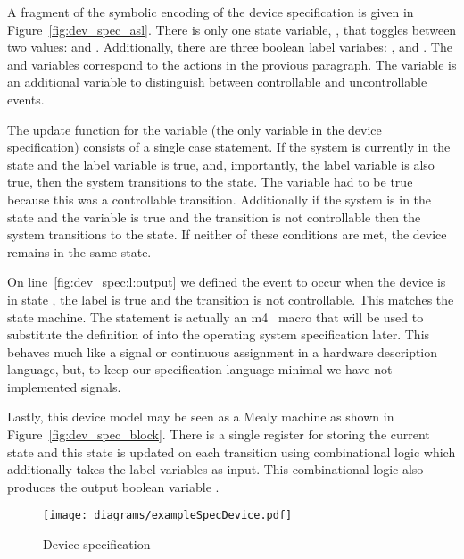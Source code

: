 A fragment of the symbolic encoding of the device specification is given in Figure~\ref{fig:dev_spec_asl}. There is only one state variable, , that toggles between two values:  and . Additionally, there are three boolean label variabes: ,  and . The  and  variables correspond to the actions in the provious paragraph. The  variable is an additional variable to distinguish between controllable and uncontrollable events. 

The update function for the  variable (the only variable in the device specification) consists of a single case statement. If the system is currently in the  state and the  label variable is true, and, importantly, the  label variable is also true, then the system transitions to the  state. The  variable had to be true because this was a controllable transition. Additionally if the system is in the  state and the  variable is true and the transition is not controllable then the system transitions to the  state. If neither of these conditions are met, the device remains in the same state. 

On line~\ref{fig:dev_spec:l:output} we defined the  event to occur when the device is in state , the  label is true and the transition is not controllable. This matches the state machine. The  statement is actually an m4~\cite{m4} macro that will be used to substitute the definition of  into the operating system specification later. This behaves much like a signal or continuous assignment in a hardware description language, but, to keep our specification language minimal we have not implemented signals.

Lastly, this device model may be seen as a Mealy machine as shown in Figure~\ref{fig:dev_spec_block}. There is a single register for storing the current state and this state is updated on each transition using combinational logic which additionally takes the label variables as input. This combinational logic also produces the output boolean variable .

\begin{figure}
\centering
\texttt{[image: diagrams/exampleSpecDevice.pdf]}
\caption{Device specification}
\label{fig:dev_spec}
\end{figure}

